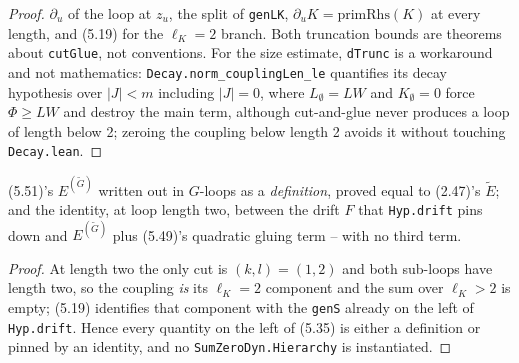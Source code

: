 \begin{proof}\leanok
  $\partial_u$ of the loop at $z_u$, the split of \texttt{genLK}, $\partial_u K=\mathrm{primRhs}(K)$
  at every length, and (5.19) for the $\ell_K=2$ branch.  Both truncation bounds are theorems about
  \texttt{cutGlue}, not conventions.  For the size estimate, \texttt{dTrunc} is a workaround and
  not mathematics: \texttt{Decay.norm\_couplingLen\_le} quantifies its decay hypothesis over
  $|J|<m$ including $|J|=0$, where $L_\emptyset=LW$ and $K_\emptyset=0$ force $\Phi\ge LW$ and
  destroy the main term, although cut-and-glue never produces a loop of length below 2; zeroing
  the coupling below length 2 avoids it without touching \texttt{Decay.lean}.
\end{proof}

\begin{theorem}\label{thm:egdef}
  \leanok{}
  (5.51)'s $E^{(\tilde G)}$ written out in $G$-loops as a \emph{definition}, proved equal to
  (2.47)'s $\tilde E$; and the identity, at loop length two, between the drift $F$ that
  \texttt{Hyp.drift} pins down and $E^{(\tilde G)}$ plus (5.49)'s quadratic gluing term -- with no
  third term.
\end{theorem}
\begin{proof}\leanok
  At length two the only cut is $(k,l)=(1,2)$ and both sub-loops have length two, so the coupling
  \emph{is} its $\ell_K=2$ component and the sum over $\ell_K>2$ is empty; (5.19) identifies that
  component with the \texttt{genS} already on the left of \texttt{Hyp.drift}.  Hence every quantity
  on the left of (5.35) is either a definition or pinned by an identity, and no
  \texttt{SumZeroDyn.Hierarchy} is instantiated.
\end{proof}

